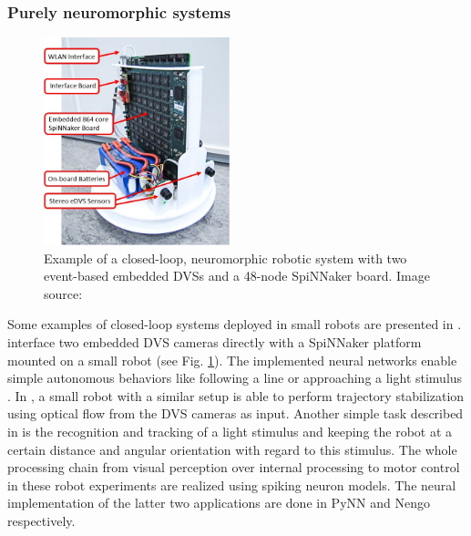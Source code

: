 \subsubsection{Purely neuromorphic systems}
\label{subsubsec:neuro_systems}

\begin{figure}[t!]
	\centering
	\includegraphics[width=0.48\textwidth]{imgs/SpinRobot.jpg}
	\caption{Example of a closed-loop, neuromorphic robotic system with two event-based embedded \acp{DVS} and a 48-node \ac{SpiNNaker} board. Image source: \textcite{Galluppi2014}}
	\label{fig:spin_robot}
\end{figure}
Some examples of closed-loop systems deployed in small robots are presented in \textcite{Davies2010, Denk2013, Galluppi2014}.
\textcites{Davies2010, Denk2013} interface two embedded \ac{DVS} cameras directly with a \ac{SpiNNaker} platform mounted on a small robot (see Fig. \ref{fig:spin_robot}).
The implemented neural networks enable simple autonomous behaviors like following a line \parencite{Davies2010} or approaching a light stimulus \parencite{Denk2013}.
In \textcite{Galluppi2014}, a small robot with a similar setup is able to perform trajectory stabilization using optical flow from the \ac{DVS} cameras as input.
Another simple task described in \textcite{Galluppi2014} is the recognition and tracking of a light stimulus and keeping the robot at a certain distance and angular orientation with regard to this stimulus.
The whole processing chain from visual perception over internal processing to motor control in these robot experiments are realized using spiking neuron models.
The neural implementation of the latter two applications are done in \ac{PyNN} and \ac{Nengo} respectively.

